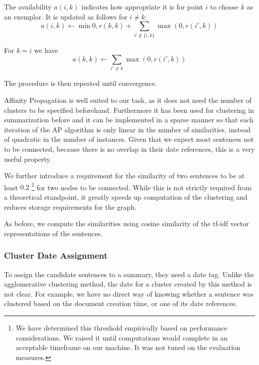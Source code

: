 \documentclass[a4paper,BCOR=10mm]{report}
\numberwithin{lemma}{chapter}
\numberwithin{definition}{chapter}
\begin{document}
The availability $a(i, k)$ indicates how appropriate it is for point $i$ to choose $k$ as an exemplar.
It is updated as follows for $i \neq k$:
\begin{equation}
a(i, k) \leftarrow \min 0, r(k, k) + \sum_{i' \not\in \{i, k\}} \max(0, r(i', k))
\end{equation}

For $k = i$ we have
\begin{equation}
a(k, k) \leftarrow \sum_{i' \neq k} \max(0, r(i', k))
\end{equation}

The procedure is then repeated until convergence.

Affinity Propagation is well suited to our task, as it does not need the number of clusters to be specified beforehand. Furthermore it has been used for clustering in summarization before \citep{salient-updates-disaster} and it can be implemented in a sparse manner so that each iteration of the AP algorithm is only linear in the number of similarities, instead of quadratic in the number of instances. Given that we expect most sentences not to be connected, because there is no overlap in their date references, this is a very useful property.

We further introduce a requirement for the similarity of two sentences to be at least $0.2$ \footnote{We have determined this threshold empirically based on performance considerations. We raised it until computations would complete in an acceptable timeframe on our machine. It was not tuned on the evaluation measures.} for two nodes to be connected. While this is not strictly required from a theoretical standpoint, it greatly speeds up computation of the clustering and reduces storage requirements for the graph.

As before, we compute the similarities using cosine similarity of the tf-idf vector representations of the sentences.

\subsubsection{Cluster Date Assignment}

To assign the candidate sentences to a summary, they need a date tag. Unlike the agglomerative clustering method, the date for a cluster created by this method is not clear. For example, we have no direct way of knowing whether a sentence was clustered based on the document creation time, or one of its date references.
\end{document}
